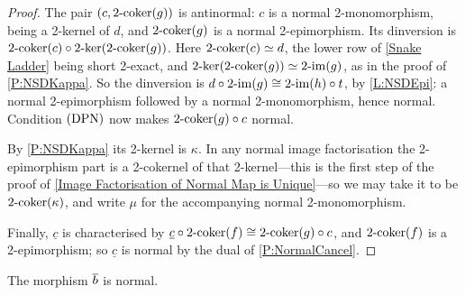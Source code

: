 \begin{proof}
  \leanok
  The pair \((c,2\text{-}\mathrm{coker}(g))\) is antinormal: \(c\) is a normal 2-monomorphism, being a 2-kernel of \(d\), and \(2\text{-}\mathrm{coker}(g)\) is a normal 2-epimorphism. Its dinversion is \(2\text{-}\mathrm{coker}(c)\circ2\text{-}\mathrm{ker}(2\text{-}\mathrm{coker}(g))\). Here \(2\text{-}\mathrm{coker}(c)\simeq d\), the lower row of \eqref{Snake Ladder} being short 2-exact, and \(2\text{-}\mathrm{ker}(2\text{-}\mathrm{coker}(g))\simeq2\text{-}\mathrm{im}(g)\), as in the proof of \prox\ref{P:NSDKappa}. So the dinversion is \(d\circ2\text{-}\mathrm{im}(g)\cong2\text{-}\mathrm{im}(h)\circ t\), by \lemx\ref{L:NSDEpi}: a normal 2-epimorphism followed by a normal 2-monomorphism, hence normal. Condition \(\textup{(DPN)}\) now makes \(2\text{-}\mathrm{coker}(g)\circ c\) normal.

	By \prox\ref{P:NSDKappa} its 2-kernel is \(\kappa\). In any normal image factorisation the 2-epimorphism part is a 2-cokernel of that 2-kernel---this is the first step of the proof of \prox\ref{Image Factorisation of Normal Map is Unique}---so we may take it to be \(2\text{-}\mathrm{coker}(\kappa)\), and write \(\mu\) for the accompanying normal 2-monomorphism.

	Finally, \(\underline{c}\) is characterised by \(\underline{c}\circ2\text{-}\mathrm{coker}(f)\cong2\text{-}\mathrm{coker}(g)\circ c\), and \(2\text{-}\mathrm{coker}(f)\) is a 2-epimorphism; so \(\underline{c}\) is normal by the dual of \prox\ref{P:NormalCancel}.
\end{proof}

\begin{proposition}
  \label{P:NSDbbar}   \leanok
  The morphism \(\overline{b}\) is normal.
\end{proposition}

